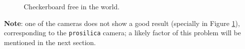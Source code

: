 \begin{figure}[!htbp]
 \centering
 \caption{Checkerboard free in the world.}
 \label{fig:cal_free}
\end{figure}

\noindent
\textbf{Note}: one of the cameras does not show a good result (specially in Figure \ref{fig:cal_free}), corresponding to the \texttt{prosilica} camera; a likely factor of this problem will be mentioned in the next section.


